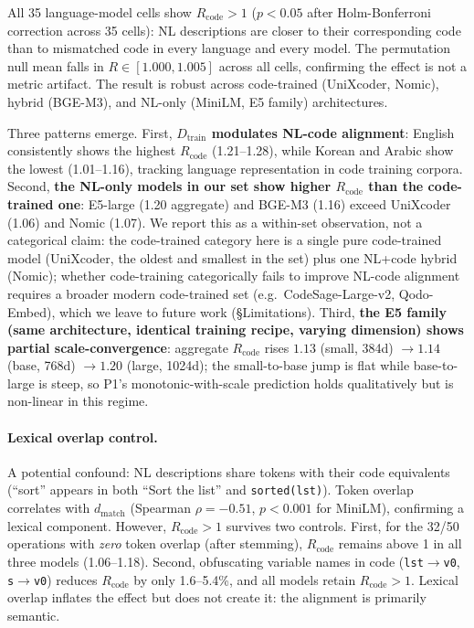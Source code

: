 \documentclass[11pt]{article}
\theoremstyle{definition}
\newcommand{\Dtrain}{D_{\text{train}}}
\begin{document}
All 35 language-model cells show $R_{\text{code}} > 1$ ($p < 0.05$ after Holm-Bonferroni correction across 35 cells): NL descriptions are closer to their corresponding code than to mismatched code in every language and every model. The permutation null mean falls in $R \in [1.000, 1.005]$ across all cells, confirming the effect is not a metric artifact. The result is robust across code-trained (UniXcoder, Nomic), hybrid (BGE-M3), and NL-only (MiniLM, E5 family) architectures.

Three patterns emerge. First, \textbf{$\Dtrain$ modulates NL-code alignment}: English consistently shows the highest $R_{\text{code}}$ (1.21--1.28), while Korean and Arabic show the lowest (1.01--1.16), tracking language representation in code training corpora. Second, \textbf{the NL-only models in our set show higher $R_{\text{code}}$ than the code-trained one}: E5-large (1.20 aggregate) and BGE-M3 (1.16) exceed UniXcoder (1.06) and Nomic (1.07). We report this as a within-set observation, not a categorical claim: the code-trained category here is a single pure code-trained model (UniXcoder, the oldest and smallest in the set) plus one NL+code hybrid (Nomic); whether code-training categorically fails to improve NL-code alignment requires a broader modern code-trained set (e.g.\ CodeSage-Large-v2, Qodo-Embed), which we leave to future work (\S Limitations). Third, \textbf{the E5 family (same architecture, identical training recipe, varying dimension) shows partial scale-convergence}: aggregate $R_{\text{code}}$ rises $1.13$ (small, 384d) $\to 1.14$ (base, 768d) $\to 1.20$ (large, 1024d); the small-to-base jump is flat while base-to-large is steep, so P1's monotonic-with-scale prediction holds qualitatively but is non-linear in this regime.

\paragraph{Lexical overlap control.} A potential confound: NL descriptions share tokens with their code equivalents (``sort'' appears in both ``Sort the list'' and \texttt{sorted(lst)}). Token overlap correlates with $d_{\text{match}}$ (Spearman $\rho = -0.51$, $p < 0.001$ for MiniLM), confirming a lexical component. However, $R_{\text{code}} > 1$ survives two controls. First, for the 32/50 operations with \emph{zero} token overlap (after stemming), $R_{\text{code}}$ remains above 1 in all three models (1.06--1.18). Second, obfuscating variable names in code (\texttt{lst}$\to$\texttt{v0}, \texttt{s}$\to$\texttt{v0}) reduces $R_{\text{code}}$ by only 1.6--5.4\%, and all models retain $R_{\text{code}} > 1$. Lexical overlap inflates the effect but does not create it: the alignment is primarily semantic.
\end{document}
